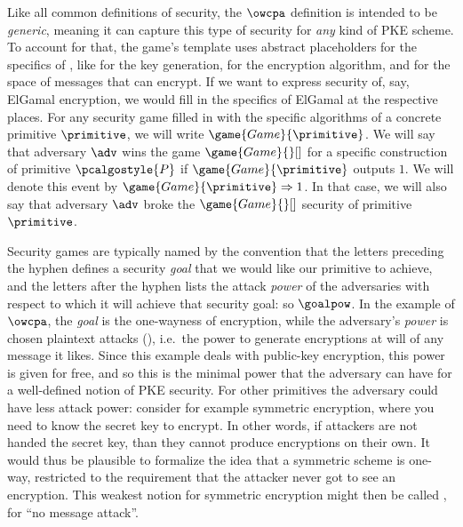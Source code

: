       Like all common definitions of security, the $\owcpa$ definition is intended to be \emph{generic},
      	meaning it can capture this type of security for \emph{any} kind of PKE scheme.
      	To account for that, the game's template uses abstract placeholders for the specifics of \PKE, like
      	\KG for the key generation, \Enc for the encryption algorithm,
      	and \Mspace for the space of messages that \PKE can encrypt.
      	If we want to express security of, say, ElGamal encryption, we would
        fill in the specifics of ElGamal at the respective places.
      	For any security game filled in with the specific algorithms of a concrete primitive $\primitive$,
      	we will write $\game{Game}{\primitive}$.
      	We will say that adversary $\adv$ wins the game $\game{Game}{}[]$
        for a specific construction of primitive $\pcalgostyle{P}$
        if $\game{Game}{\primitive}$ outputs $1$.
        We will denote this event by $\game{Game}{\primitive} \Rightarrow 1$.
        In that case, we will also say that adversary $\adv$ broke the
        $\game{Game}{}[]$ security of primitive $\primitive$.
        
      Security games are typically named by the convention that the letters
	      preceding the hyphen defines a security \emph{goal} that we would like our 
	      primitive \primitive to achieve, and the letters after the hyphen lists the
	      attack \emph{power} of the adversaries with respect to which it will
	      achieve that security goal: so $\goalpow$. In the example of $\owcpa$, the
	      \emph{goal} is the one-wayness of encryption, while the adversary's \emph{power} is
	      chosen plaintext attacks (), i.e.\ the power to generate encryptions
	      at will of any message it likes. Since this example deals with public-key
	      encryption, this power is given for free, and so this is the minimal
	      power that the adversary can have for a well-defined notion of PKE
	      security. For other primitives the adversary
	      could have less attack power: consider for example symmetric
	      encryption, where you need to know the secret key to encrypt.
	      In other words, if attackers are not handed the secret key,
	      than they cannot produce encryptions on their own.
	      It would thus be plausible to formalize the idea that a symmetric scheme is one-way,
	      restricted to the requirement that the attacker never got to see an encryption.
	      This weakest notion for symmetric encryption might then be
	      called \ownma, for ``no message attack''.
      

